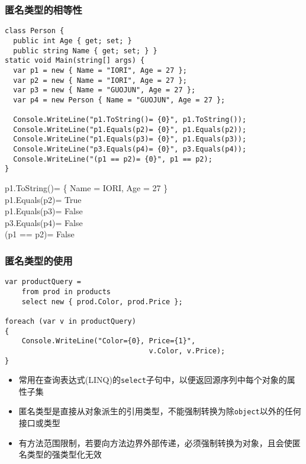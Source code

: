\begin{frame}[fragile]
\frametitle{匿名类型的相等性}
\lstset{basicstyle=\ttfamily\scriptsize}
\begin{lstlisting}
class Person {
  public int Age { get; set; }
  public string Name { get; set; } }
static void Main(string[] args) {
  var p1 = new { Name = "IORI", Age = 27 };
  var p2 = new { Name = "IORI", Age = 27 };
  var p3 = new { Name = "GUOJUN", Age = 27 };
  var p4 = new Person { Name = "GUOJUN", Age = 27 };

  Console.WriteLine("p1.ToString()= {0}", p1.ToString());
  Console.WriteLine("p1.Equals(p2)= {0}", p1.Equals(p2));
  Console.WriteLine("p1.Equals(p3)= {0}", p1.Equals(p3));
  Console.WriteLine("p3.Equals(p4)= {0}", p3.Equals(p4));
  Console.WriteLine("(p1 == p2)= {0}", p1 == p2);
}
\end{lstlisting}
\scriptsize
p1.ToString()= \{ Name = IORI, Age = 27 \}\\
p1.Equals(p2)= True\\
p1.Equals(p3)= False\\
p3.Equals(p4)= False\\
(p1 == p2)= False\\
\end{frame}

\begin{frame}[fragile]
\frametitle{匿名类型的使用}
\begin{lstlisting}
var productQuery =
    from prod in products
    select new { prod.Color, prod.Price };

foreach (var v in productQuery)
{
    Console.WriteLine("Color={0}, Price={1}",
                                  v.Color, v.Price);
}
\end{lstlisting}
\begin{itemize}%
\item 常用在查询表达式(LINQ)的\texttt{select}子句中，以便返回源序列中每个对象的属性子集
\item 匿名类型是直接从对象派生的引用类型，不能强制转换为除\texttt{object}以外的任何接口或类型
\item 有方法范围限制，若要向方法边界外部传递，必须强制转换为对象，且会使匿名类型的强类型化无效
\end{itemize}
\end{frame}

